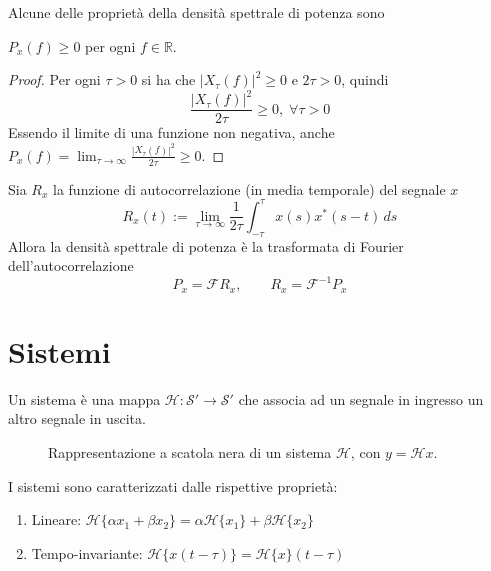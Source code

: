         Alcune delle proprietà della densità spettrale di potenza sono

        \begin{property}
            $P_x(f) \geq 0$ per ogni $f \in \mathbb{R}$.
        \end{property}
        \begin{proof}
            Per ogni $\tau > 0$ si ha che $|X_{\tau}(f)|^2 \geq 0$ e $2\tau > 0$, quindi
            \[
                \frac{|X_{\tau}(f)|^2}{2 \tau} \geq 0, \; \forall \tau > 0
            \]
            Essendo il limite di una funzione non negativa, anche $P_x(f) = \lim_{\tau \rightarrow \infty} \frac{|X_{\tau}(f)|^2}{2 \tau} \geq 0$.
        \end{proof}

        \begin{property}
            Sia $R_x$ la funzione di autocorrelazione (in media temporale) del segnale $x$
            \[
                R_x(t) := \lim_{\tau \rightarrow \infty} \frac{1}{2\tau} \int_{-\tau}^{\tau} x(s) x^*(s - t) \, ds
            \]
            Allora la densità spettrale di potenza è la trasformata di Fourier dell'autocorrelazione
            \[
                P_x = \mathcal{F} R_x, \qquad R_x = \mathcal{F}^{-1} P_x
            \]
        \end{property}

 
\newpage
\section{Sistemi}
    Un sistema è una mappa $\mathcal{H}: \mathcal{S}' \rightarrow \mathcal{S}'$ che associa ad un segnale in ingresso un altro segnale in uscita.

    \begin{figure}[ht]
        \centering
        \caption{Rappresentazione a scatola nera di un sistema $\mathcal{H}$, con $y = \mathcal{H} x$.}
        \label{fig:sistema}
    \end{figure}

    I sistemi sono caratterizzati dalle rispettive proprietà:
    \begin{enumerate}
        \item Lineare: $\mathcal{H}\{\alpha x_1 + \beta x_2\} = \alpha \mathcal{H}\{x_1\} + \beta \mathcal{H}\{x_2\}$
        \item Tempo-invariante: $\mathcal{H}\{x(t - \tau)\} = \mathcal{H}\{x\}(t - \tau)$
    \end{enumerate}

